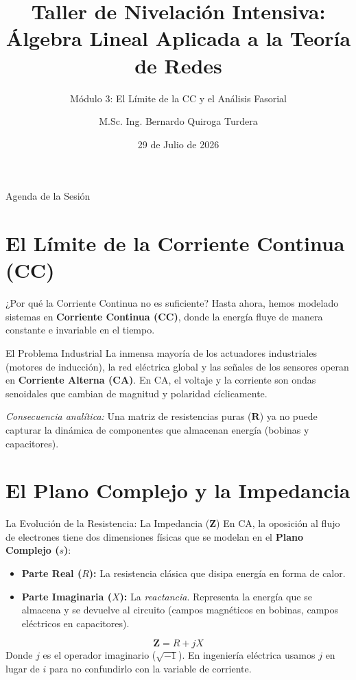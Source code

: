 \documentclass[aspectratio=169]{beamer}
\title[Nivelación - Sesión 2]{Taller de Nivelación Intensiva:\\ Álgebra Lineal Aplicada a la Teoría de Redes}
\subtitle{Módulo 3: El Límite de la CC y el Análisis Fasorial}
\author[M.Sc. Ing. B. Quiroga Turdera]{M.Sc. Ing. Bernardo Quiroga Turdera}
\institute[UCB Tarija]{Carrera de Ingeniería Mecatrónica\\ Universidad Católica Boliviana "San Pablo"}
\date{29 de Julio de 2026}
\begin{document}
\begin{frame}
    \titlepage
\end{frame}

\begin{frame}{Agenda de la Sesión}
    \tableofcontents
\end{frame}

\section{El Límite de la Corriente Continua (CC)}
\begin{frame}{¿Por qué la Corriente Continua no es suficiente?}
    Hasta ahora, hemos modelado sistemas en \textbf{Corriente Continua (CC)}, donde la energía fluye de manera constante e invariable en el tiempo.
    
    \vspace{0.3cm}
    \begin{alertblock}{El Problema Industrial}
    La inmensa mayoría de los actuadores industriales (motores de inducción), la red eléctrica global y las señales de los sensores operan en \textbf{Corriente Alterna (CA)}. En CA, el voltaje y la corriente son ondas senoidales que cambian de magnitud y polaridad cíclicamente.
    \end{alertblock}
    
    \vspace{0.2cm}
    \textit{Consecuencia analítica:} Una matriz de resistencias puras ($\mathbf{R}$) ya no puede capturar la dinámica de componentes que almacenan energía (bobinas y capacitores).
\end{frame}

\section{El Plano Complejo y la Impedancia}
\begin{frame}{La Evolución de la Resistencia: La Impedancia ($\mathbf{Z}$)}
    En CA, la oposición al flujo de electrones tiene dos dimensiones físicas que se modelan en el \textbf{Plano Complejo ($s$)}:
    
    \vspace{0.3cm}
    \begin{itemize}
        \item \textbf{Parte Real ($R$):} La resistencia clásica que disipa energía en forma de calor.
        \item \textbf{Parte Imaginaria ($X$):} La \textit{reactancia}. Representa la energía que se almacena y se devuelve al circuito (campos magnéticos en bobinas, campos eléctricos en capacitores).
    \end{itemize}
    
    \vspace{0.3cm}
    \begin{tcolorbox}[colback=blue!5!white,colframe=UCBblue,title=Definición Matemática de la Impedancia]
    $$ \mathbf{Z} = R + jX $$
    Donde $j$ es el operador imaginario ($\sqrt{-1}$). En ingeniería eléctrica usamos $j$ en lugar de $i$ para no confundirlo con la variable de corriente.
    \end{tcolorbox}
\end{frame}
\end{document}
